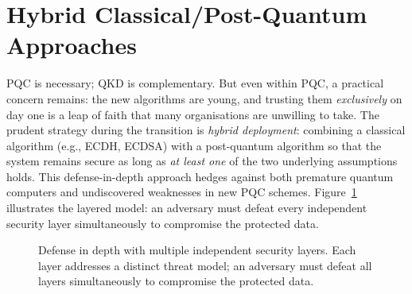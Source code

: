 \section{Hybrid Classical/Post-Quantum Approaches}
\label{sec:hybrid-intro}

PQC is necessary; QKD is complementary.  But even within PQC, a practical concern remains: the new algorithms are young, and trusting them \emph{exclusively} on day one is a leap of faith that many organisations are unwilling to take.  The prudent strategy during the transition is \emph{hybrid deployment}: combining a classical algorithm (e.g., ECDH, ECDSA) with a post-quantum algorithm so that the system remains secure as long as \emph{at least one} of the two underlying assumptions holds.  This defense-in-depth approach hedges against both premature quantum computers and undiscovered weaknesses in new PQC schemes.  Figure~\ref{fig:ch05-defense-depth} illustrates the layered model: an adversary must defeat every independent security layer simultaneously to compromise the protected data.

\begin{figure}[t]
\centering
{}
\caption{Defense in depth with multiple independent security layers.  Each layer addresses a distinct threat model; an adversary must defeat all layers simultaneously to compromise the protected data.}
\label{fig:ch05-defense-depth}
\end{figure}

